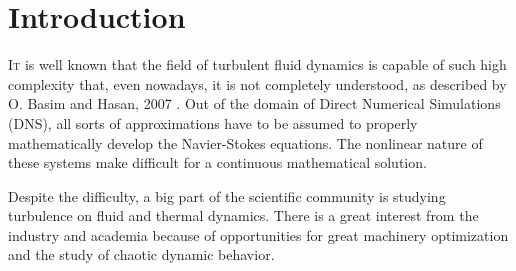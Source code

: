 \documentclass[10pt]{article} %
\begin{document}
%
%
%	
%	
%	
%	
%	
%	
%	
%	
%	
%	
%	
%	
%	
%	
%	
%	
%	
%	
%	
%	
%	
%	
%	
%	
%	
%	
%	
%	
%	
%	
%	
%	
%	
%	
%	
%	
%	
%	
%	
%	
%	
%	
%	
%	
%	
%	
%	
%	
%	
%	
%	
%	
%	
%	
%	
%	
%	
%	
%	
%	 


\section{Introduction}

\lettrine[nindent=0em,lines=2]{I}t is well known that the field of turbulent fluid dynamics is capable of such high complexity that, even nowadays, it is not completely understood, as described by O. Basim and Hasan, 2007 \cite{hasan}. Out of the domain of Direct Numerical Simulations (DNS), all sorts of approximations have to be assumed to properly mathematically develop the Navier-Stokes equations. The nonlinear nature of these systems \cite{John} make difficult for a continuous mathematical solution. 

Despite the difficulty, a big part of the scientific community is studying turbulence on fluid and thermal dynamics. There is a great interest from the industry and academia because of opportunities for great machinery optimization and the study of chaotic dynamic behavior.   
\end{document}
